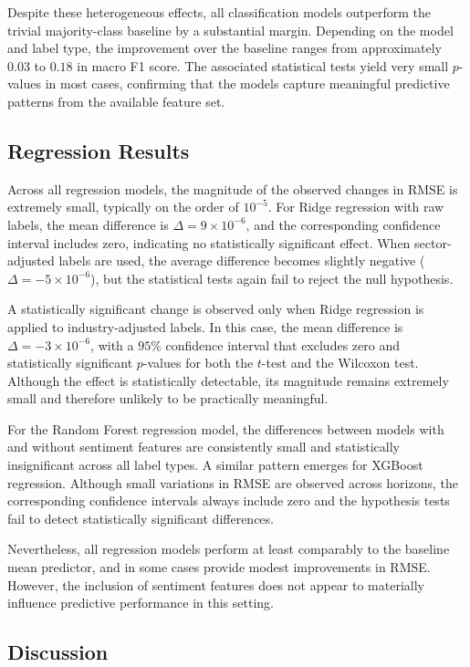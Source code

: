 Despite these heterogeneous effects, all classification models outperform the trivial majority-class baseline by a substantial margin. Depending on the model and label type, the improvement over the baseline ranges from approximately $0.03$ to $0.18$ in macro F1 score. The associated statistical tests yield very small $p$-values in most cases, confirming that the models capture meaningful predictive patterns from the available feature set.

\subsection{Regression Results}

Across all regression models, the magnitude of the observed changes in RMSE is extremely small, typically on the order of $10^{-5}$. For Ridge regression with raw labels, the mean difference is $\Delta = 9 \times 10^{-6}$, and the corresponding confidence interval includes zero, indicating no statistically significant effect. When sector-adjusted labels are used, the average difference becomes slightly negative ($\Delta = -5 \times 10^{-6}$), but the statistical tests again fail to reject the null hypothesis.

A statistically significant change is observed only when Ridge regression is applied to industry-adjusted labels. In this case, the mean difference is $\Delta = -3 \times 10^{-6}$, with a $95\%$ confidence interval that excludes zero and statistically significant $p$-values for both the $t$-test and the Wilcoxon test. Although the effect is statistically detectable, its magnitude remains extremely small and therefore unlikely to be practically meaningful.

For the Random Forest regression model, the differences between models with and without sentiment features are consistently small and statistically insignificant across all label types. A similar pattern emerges for XGBoost regression. Although small variations in RMSE are observed across horizons, the corresponding confidence intervals always include zero and the hypothesis tests fail to detect statistically significant differences.

Nevertheless, all regression models perform at least comparably to the baseline mean predictor, and in some cases provide modest improvements in RMSE. However, the inclusion of sentiment features does not appear to materially influence predictive performance in this setting.

\subsection{Discussion}

